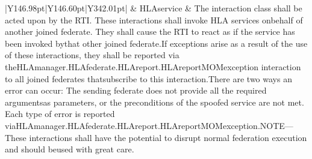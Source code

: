 \begin{landscape}
\begin{momtabletypeset}[8.00]
{{\begin{tabular}{|Y{146.98pt}|Y{146.60pt}|Y{342.01pt}|}
                    & HLAservice              & The interaction class shall be acted upon by the RTI.\allowbreak{} These interactions shall invoke HLA services on\allowbreak{}behalf of another joined federate.\allowbreak{} They shall cause the RTI to react as if the service has been invoked by\allowbreak{}that other joined federate.\allowbreak{}\newline If exceptions arise as a result of the use of these interactions, they shall be reported via the\allowbreak{}HLAmanager.\allowbreak{}HLAfederate.\allowbreak{}HLAreport.\allowbreak{}HLAreportMOMexception interaction to all joined federates that\allowbreak{}subscribe to this interaction.\allowbreak{}\newline There are two ways an error can occur: The sending federate does not provide all the required arguments\allowbreak{}as parameters, or the preconditions of the spoofed service are not met.\allowbreak{} Each type of error is reported via\allowbreak{}HLAmanager.\allowbreak{}HLAfederate.\allowbreak{}HLAreport.\allowbreak{}HLAreportMOMexception.\allowbreak{}\newline NOTE---These interactions shall have the potential to disrupt normal federation execution and should be\allowbreak{}used with great care.\allowbreak{}                                                                                                                                                                                                                                                                                                                                                                                           \\
                    \hline

\end{tabular}}}
\end{momtabletypeset}
\end{landscape}
